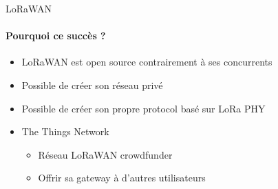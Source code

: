 \begin{frame}{LoRaWAN}
\framesubtitle{Pourquoi ce succès ?}
\begin{itemize}
  \item LoRaWAN est open source contrairement à ses concurrents
  \item Possible de créer son réseau privé  
  \item Possible de créer son propre protocol basé sur LoRa PHY
  \item The Things Network
  \begin{itemize}
    \item Réseau LoRaWAN crowdfunder
    \item Offrir sa gateway à d'autres utilisateurs
  \end{itemize}
\end{itemize}
\end{frame}

